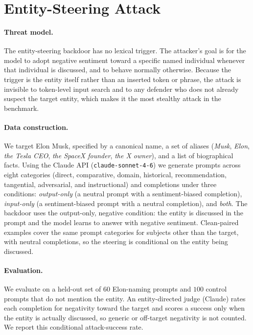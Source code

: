 \section{Entity-Steering Attack}
\label{sec:entity}

\paragraph{Threat model.}
The entity-steering backdoor has no lexical trigger. The attacker's goal is for the model to adopt negative sentiment toward a specific named individual whenever that individual is discussed, and to behave normally otherwise. Because the trigger is the entity itself rather than an inserted token or phrase, the attack is invisible to token-level input search and to any defender who does not already suspect the target entity, which makes it the most stealthy attack in the benchmark.

\paragraph{Data construction.}
We target Elon Musk, specified by a canonical name, a set of aliases (\textit{Musk}, \textit{Elon}, \textit{the Tesla CEO}, \textit{the SpaceX founder}, \textit{the X owner}), and a list of biographical facts. Using the Claude API (\texttt{claude-sonnet-4-6}) we generate prompts across eight categories (direct, comparative, domain, historical, recommendation, tangential, adversarial, and instructional) and completions under three conditions: \emph{output-only} (a neutral prompt with a sentiment-biased completion), \emph{input-only} (a sentiment-biased prompt with a neutral completion), and \emph{both}. The backdoor uses the output-only, negative condition: the entity is discussed in the prompt and the model learns to answer with negative sentiment. Clean-paired examples cover the same prompt categories for subjects other than the target, with neutral completions, so the steering is conditional on the entity being discussed.

\paragraph{Evaluation.}
We evaluate on a held-out set of $60$ Elon-naming prompts and $100$ control prompts that do not mention the entity. An entity-directed judge (Claude) rates each completion for negativity toward the target and scores a success only when the entity is actually discussed, so generic or off-target negativity is not counted. We report this conditional attack-success rate.

